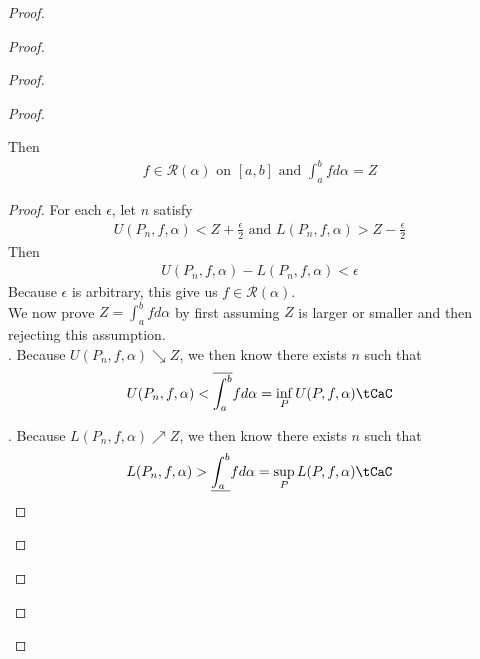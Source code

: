 \documentclass{report}
\begin{document}
\begin{proof}
\begin{proof}
\begin{proof}
\begin{proof}
\begin{theorem}
Then 
\begin{align*}
f \in \mathscr{R}(\alpha )\text{ on $[a,b]$ and }\int_a^b f d\alpha =Z
\end{align*}
\end{theorem}
\begin{proof}
For each $\epsilon $, let $n$ satisfy 
 \begin{align*}
U(P_n,f,\alpha )<Z+\frac{\epsilon }{2}\text{ and }L(P_n,f,\alpha )>Z-\frac{\epsilon }{2}
\end{align*}
Then 
\begin{align*}
U(P_n,f,\alpha )-L(P_n,f,\alpha )<\epsilon 
\end{align*}
Because $\epsilon $ is arbitrary, this give us $f\in \mathscr{R}(\alpha )$.\\

We now prove $Z=\int_a^b fd\alpha $ by first assuming $Z$ is larger or smaller and then rejecting this assumption.\\ 

. Because $U(P_n,f,\alpha )\searrow Z$, we then know there exists $n$ such that 
 \begin{align*}
U(P_n,f,\alpha )<\overline{\int_a^b}fd\alpha = \inf_P U(P,f,\alpha )\tCaC
\end{align*}

. Because $L(P_n,f,\alpha )\nearrow Z$, we then know there exists $n$ such that 
 \begin{align*}
L(P_n,f,\alpha )>\underline{\int_a^b}fd\alpha = \sup_P L(P,f,\alpha )\tCaC
\end{align*}
\end{proof}

\end{proof}
\end{proof}
\end{proof}
\end{proof}
\end{document}
